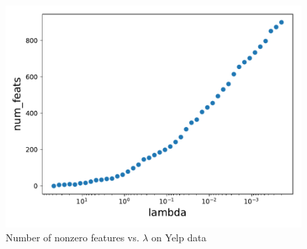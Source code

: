 \documentclass[11pt,letterpaper]{article}
\numberwithin{equation}{section}
\numberwithin{figure}{section}
\begin{document}
\begin{enumerate}
		\begin{figure}[H]
			\centering
			\includegraphics[width=.6\textwidth]{figures/yelp_nfeats.pdf}
			\caption{Number of nonzero features vs. $\lambda$ on Yelp data}
		\end{figure}
















\end{enumerate}
\end{document}
